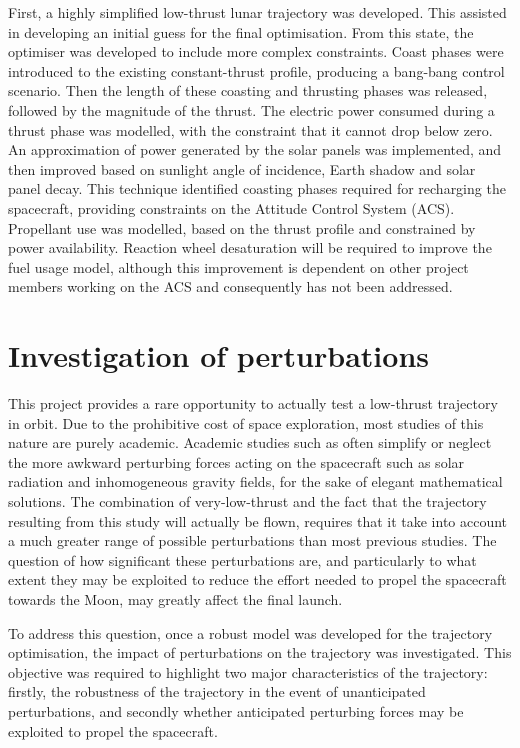 First, a highly simplified low-thrust lunar trajectory was developed. This assisted in developing an initial guess for the final optimisation. From this state, the optimiser was developed to include more complex constraints. Coast phases were introduced to the existing constant-thrust profile, producing a bang-bang control scenario. Then the length of these coasting and thrusting phases was released, followed by the magnitude of the thrust. The electric power consumed during a thrust phase was modelled, with the constraint that it cannot drop below zero. An approximation of power generated by the solar panels was implemented, and then improved based on sunlight angle of incidence, Earth shadow and solar panel decay. This technique identified coasting phases required for recharging the spacecraft, providing constraints on the Attitude Control System (ACS). Propellant use was modelled, based on the thrust profile and constrained by power availability. Reaction wheel desaturation will be required to improve the fuel usage model, although this improvement is dependent on other project members working on the ACS and consequently has not been addressed.

\section{Investigation of perturbations} \label{sec:Perturbation-objective}

This project provides a rare opportunity to actually test a low-thrust trajectory in orbit. Due to the prohibitive cost of space exploration, most studies of this nature are purely academic. Academic studies such as \textcite{Betts2000} often simplify or neglect the more awkward perturbing forces acting on the spacecraft such as solar radiation and inhomogeneous gravity fields, for the sake of elegant mathematical solutions. The combination of very-low-thrust and the fact that the trajectory resulting from this study will actually be flown, requires that it take into account a much greater range of possible perturbations than most previous studies. The question of how significant these perturbations are, and particularly to what extent they may be exploited to reduce the effort needed to propel the spacecraft towards the Moon, may greatly affect the final launch.

To address this question, once a robust model was developed for the trajectory optimisation, the impact of perturbations on the trajectory was investigated. This objective was required to highlight two major characteristics of the trajectory: firstly, the robustness of the trajectory in the event of unanticipated perturbations, and secondly whether anticipated perturbing forces may be exploited to propel the spacecraft.

